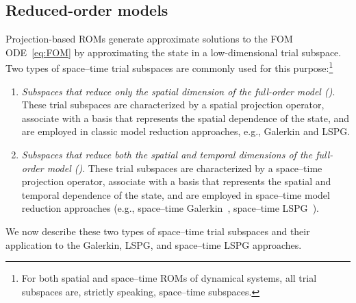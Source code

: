 \documentclass[3p,computermodern,10pt]{elsarticle}
\begin{document}
 \subsection{Reduced-order models}
Projection-based ROMs generate approximate solutions to the FOM
	ODE~\eqref{eq:FOM} by approximating the state in a low-dimensional trial
	subspace. Two types of space--time trial subspaces are commonly used for
	this purpose:\footnote{For both spatial and space--time ROMs of dynamical systems, all trial subspaces are, strictly speaking, space--time subspaces.} 
\begin{enumerate} 
	\item \textit{Subspaces that reduce only the spatial dimension of the full-order
		model (\spatialAcronym)}. These trial subspaces are characterized by a spatial projection operator, associate with a basis that represents the spatial dependence of the state, and are employed in classic model reduction approaches, e.g., Galerkin and LSPG. %
	\item \textit{Subspaces that reduce both the spatial and temporal dimensions of the full-order
		model (\spaceTimeAcronym)}.
These trial subspaces are characterized by a space--time projection operator, associate with a basis that represents the spatial and temporal dependence of the state, and are employed in space--time 
model reduction approaches (e.g., space--time Galerkin~\cite{benner_st}, space--time LSPG~\cite{choi_stlspg}). 
\end{enumerate}
 We now describe these two types of space--time trial subspaces and their
	application to the Galerkin, LSPG, and space--time LSPG approaches. 
\end{document}
